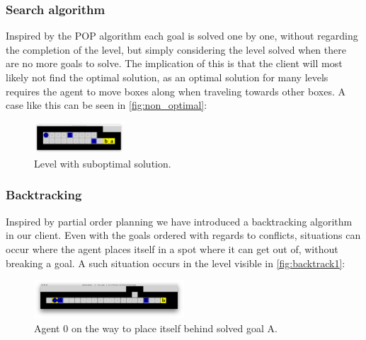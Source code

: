 \documentclass[Main]{subfiles}
\begin{document}
\subsubsection{Search algorithm}
Inspired by the POP algorithm each goal is solved one by one, without regarding the completion of the level, but simply considering the level solved when there are no more goals to solve. The implication of this is that the client will most likely not find the optimal solution, as an optimal solution for many levels requires the agent to move boxes along when traveling towards other boxes. A case like this can be seen in \autoref{fig:non_optimal}:
\begin{figure}[h!]
    \centering
    \includegraphics[width=0.3\textwidth]{non_optimal.png}
    \caption{Level with suboptimal solution.}
    \label{fig:non_optimal}
\end{figure}




\subsubsection{Backtracking}

Inspired by partial order planning we have introduced a backtracking algorithm in our client. Even with the goals ordered with regards to conflicts, situations can occur where the agent places itself in a spot where it can get out of, without breaking a goal. A such situation occurs in the level visible in \autoref{fig:backtrack1}:
\begin{figure}[h!]
    \centering
    \includegraphics[width=0.5\textwidth]{backtrack1.png}
    \caption{Agent 0 on the way to place itself behind solved goal A.}
    \label{fig:backtrack1}
\end{figure}
\end{document}
